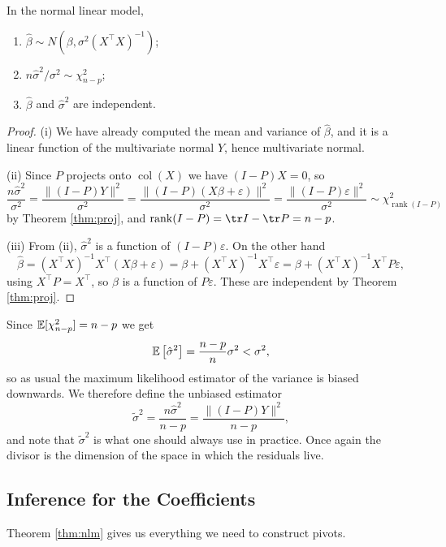 \documentclass[a4paper]{scrartcl}
\newcommand{\rank}{\operatorname{rank}}
\newcommand{\col}{\operatorname{col}}
\begin{document}
\begin{theorem}\label{thm:nlm}
  In the normal linear model,
  \begin{enumerate}[label=(\roman*)]
    \item $\hat\beta \sim N\left(\beta, \sigma^2(X^\top X)^{-1}\right)$;
    \item $n\hat\sigma^2/\sigma^2 \sim \chi^2_{n-p}$;
    \item $\hat\beta$ and $\hat\sigma^2$ are independent.
  \end{enumerate}
\end{theorem}
\begin{proof}
  (i) We have already computed the mean and variance of $\hat\beta$, and it is a linear function of the multivariate normal $Y$, hence multivariate normal.

  (ii) Since $P$ projects onto $\col(X)$ we have $(I-P)X = 0$, so
  $$
  \frac{n\hat\sigma^2}{\sigma^2} = \frac{\|(I-P)Y\|^2}{\sigma^2} = \frac{\|(I-P)(X\beta+\varepsilon)\|^2}{\sigma^2} = \frac{\|(I-P)\varepsilon\|^2}{\sigma^2}\sim\chi^2_{\rank(I-P)}
  $$
  by Theorem \ref{thm:proj}, and $\rank(I-P) = \tr I - \tr P = n - p$.

  (iii) From (ii), $\hat\sigma^2$ is a function of $(I-P)\varepsilon$. On the other hand
  $$
  \hat\beta = (X^\top X)^{-1}X^\top(X\beta+\varepsilon) = \beta + (X^\top X)^{-1}X^\top\varepsilon = \beta + (X^\top X)^{-1}X^\top P\varepsilon,
  $$
  using $X^\top P = X^\top$, so $\hat\beta$ is a function of $P\varepsilon$. These are independent by Theorem \ref{thm:proj}.
\end{proof}

Since $\mathbb{E}[\chi^2_{n-p}] = n-p$ we get
$$
\mathbb{E}\left[\hat\sigma^2\right] = \frac{n-p}{n}\sigma^2 < \sigma^2,
$$
so as usual the maximum likelihood estimator of the variance is biased downwards. We therefore define the unbiased estimator
$$
\tilde\sigma^2 = \frac{n\hat\sigma^2}{n-p} = \frac{\|(I-P)Y\|^2}{n-p},
$$
and note that $\tilde\sigma^2$ is what one should always use in practice. Once again the divisor is the dimension of the space in which the residuals live.

\subsection{Inference for the Coefficients}

Theorem \ref{thm:nlm} gives us everything we need to construct pivots.
\end{document}
